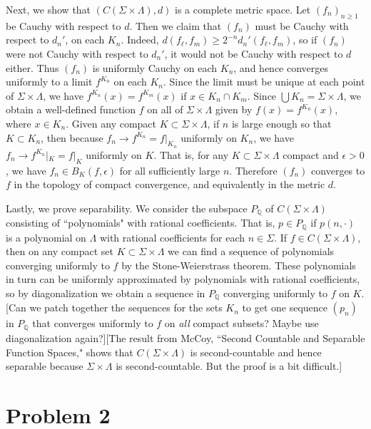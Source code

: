 \documentclass[12pt]{article}
\begin{document}
		Next, we show that $(C(\Sigma\times\Lambda), d)$ is a complete metric space. Let $(f_n)_{n\geq 1}$ be Cauchy with respect to $d$. Then we claim that $(f_n)$ must be Cauchy with respect to $d_n'$, on each $K_n$. Indeed, $d(f_\ell, f_m) \geq 2^{-n}d_n'(f_\ell, f_m)$, so if $(f_n)$ were not Cauchy with respect to $d_n'$, it would not be Cauchy with respect to $d$ either. Thus $(f_n)$ is uniformly Cauchy on each $K_n$, and hence converges uniformly to a limit $f^{K_n}$ on each $K_n$. Since the limit must be unique at each point of $\Sigma\times\Lambda$, we have $f^{K_n}(x) = f^{K_m}(x)$ if $x\in K_n\cap K_m$. Since $\bigcup K_n = \Sigma\times\Lambda$, we obtain a well-defined function $f$ on all of $\Sigma\times\Lambda$ given by $f(x)=f^{K_n}(x)$, where $x\in K_n$. Given any compact $K\subset \Sigma\times\Lambda$, if $n$ is large enough so that $K\subset K_n$, then because $f_n \to f^{K_n} = f|_{K_n}$ uniformly on $K_n$, we have $f_n \to f^{K_n}|_K = f|_K$ uniformly on $K$. That is, for any $K\subset\Sigma\times\Lambda$ compact and $\epsilon>0$, we have $f_n \in B_K(f,\epsilon)$ for all sufficiently large $n$. Therefore $(f_n)$ converges to $f$ in the topology of compact convergence, and equivalently in the metric $d$.
		
		Lastly, we prove separability. We consider the subspace $P_{\mathbb{Q}}$ of $C(\Sigma\times\Lambda)$ consisting of ``polynomials" with rational coefficients. That is, $p\in P_{\mathbb{Q}}$ if $p(n,\cdot)$ is a polynomial on $\Lambda$ with rational coefficients for each $n\in\Sigma$. If $f\in C(\Sigma\times\Lambda)$, then on any compact set $K\subset\Sigma\times\Lambda$ we can find a sequence of polynomials converging uniformly to $f$ by the Stone-Weierstrass theorem. These polynomials in turn can be uniformly approximated by polynomials with rational coefficients, so by diagonalization we obtain a sequence in $P_\mathbb{Q}$ converging uniformly to $f$ on $K$. [Can we patch together the sequences for the sets $K_n$ to get one sequence $(p_n)$ in $P_\mathbb{Q}$ that converges uniformly to $f$ on \textit{all} compact subsets? Maybe use diagonalization again?][The result from McCoy, ``Second Countable and Separable Function Spaces," shows that $C(\Sigma\times\Lambda)$ is second-countable and hence separable because $\Sigma\times\Lambda$ is second-countable. But the proof is a bit difficult.]
		
		
	\section*{Problem 2}
	
\end{document}
